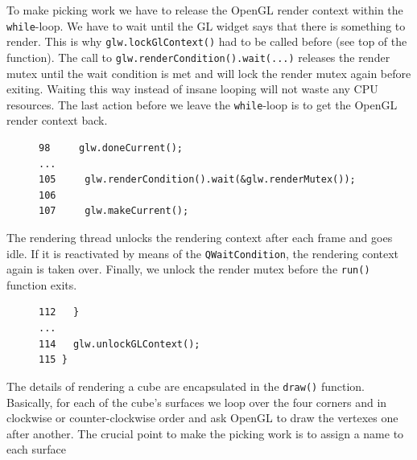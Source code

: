\documentclass[jou,noapacite]{apa}
\begin{document}
To make picking work we have to release the OpenGL render context within
the \lstinline[keywordstyle=\color{black}]|while|-loop.
%
We have to wait until the GL widget says that there is something to render.
%
This is why \lstinline|glw.lockGlContext()| had to be called before (see top of
the function).
%
The call to \lstinline|glw.renderCondition().wait(...)| releases the render
mutex until the wait condition is met and will lock the render mutex again
before exiting.
%
Waiting this way instead of insane looping will not waste any CPU resources.
%
The last action before we leave the \lstinline[keywordstyle=\color{black}]|while|-loop is to get the OpenGL
render context back.
%
\begin{figure}[h]
\begin{lstlisting}[basicstyle=\scriptsize]
 98     glw.doneCurrent();
...
105     glw.renderCondition().wait(&glw.renderMutex());
106
107     glw.makeCurrent();
\end{lstlisting}
\end{figure}
%
%
The rendering thread unlocks the rendering context after each frame and goes
idle.
%
If it is reactivated by means of the \lstinline|QWaitCondition|, the rendering
context again is taken over.
%
Finally, we unlock the render mutex before the \lstinline|run()| function exits.
\begin{figure}[h]
\begin{lstlisting}[basicstyle=\scriptsize]
112   }
...
114   glw.unlockGLContext();
115 }
\end{lstlisting}
\end{figure}
%
The details of rendering a cube are encapsulated in the \lstinline|draw()|
function.
%
Basically, for each of the cube's surfaces we loop over the four corners and in
clockwise or counter-clockwise order and ask OpenGL to draw the vertexes one
after another.
%
The crucial point to make the picking work is to assign a name to each surface
\end{document}
